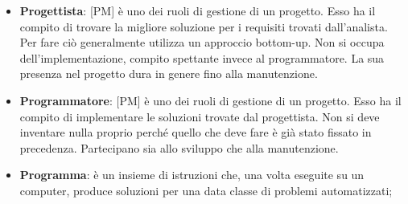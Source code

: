 \begin{itemize}
	\item \textbf{Progettista}: [PM] è uno dei ruoli di gestione di un progetto. \newline
	Esso ha il compito di trovare la migliore soluzione per i requisiti trovati dall'analista. Per fare ciò generalmente utilizza un approccio bottom-up. \newline
Non si occupa dell'implementazione, compito spettante invece al programmatore. La sua presenza nel progetto dura in genere fino alla manutenzione.
	
	\item \textbf{Programmatore}: [PM] è uno dei ruoli di gestione di un progetto. 	\newline
Esso ha il compito di implementare le soluzioni trovate dal progettista. Non si deve inventare nulla proprio perché quello che deve fare è già stato fissato in precedenza. Partecipano sia allo sviluppo che alla manutenzione.

	\item \textbf{Programma}: è un insieme di istruzioni che, una volta eseguite su un computer, produce soluzioni per una data classe di problemi automatizzati;

\end{itemize}